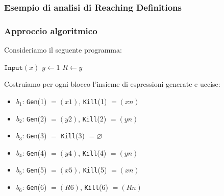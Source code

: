 \subsubsection{Esempio di analisi di Reaching Definitions}
\subsubsection{Approccio algoritmico}

\begin{minipage}{0.5\textwidth}
    Consideriamo il seguente programma:

    \begin{algorithm}[H]
        $\texttt{Input}(x)$\;
        $y \gets 1$\;
        $R \gets y$\;
    \end{algorithm}
    
    \end{minipage} 
    \begin{minipage}{0.5\textwidth}
    \begin{figure}[H]
        \centering
    \end{figure}
    \end{minipage}

    Costruiamo per ogni blocco l'insieme di espressioni generate e uccise:
    \begin{itemize}
        \item $b_1$: \texttt{Gen}(1) $= (x1)$,
        \texttt{Kill}(1) $ = (xn)$
        \item $b_2$: \texttt{Gen}(2) $= (y2)$, \texttt{Kill}(2) $= (yn)$
        \item $b_3$: \texttt{Gen}(3) $=$ \texttt{Kill}(3) $= \varnothing$
        \item $b_4$: \texttt{Gen}(4) $= (y4)$, \texttt{Kill}(4) $= (yn)$
        \item $b_5$: \texttt{Gen}(5) $= (x5)$, \texttt{Kill}(5) $= (xn)$
        \item $b_6$: \texttt{Gen}(6) $= (R6)$, \texttt{Kill}(6) $= (Rn)$
    \end{itemize}

